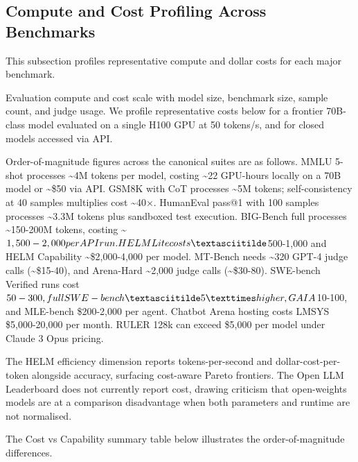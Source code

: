\documentclass{article}
\begin{document}
\subsection{Compute and Cost Profiling Across Benchmarks}\label{compute-and-cost-profiling-across-benchmarks}

This subsection profiles representative compute and dollar costs for each major benchmark.

Evaluation compute and cost scale with model size, benchmark size, sample count, and judge usage. We profile representative costs below for a frontier 70B-class model evaluated on a single H100 GPU at 50 tokens/s, and for closed models accessed via API.

Order-of-magnitude figures across the canonical suites are as follows. MMLU 5-shot processes \textasciitilde4M tokens per model, costing \textasciitilde22 GPU-hours locally on a 70B model or \textasciitilde\$50 via API. GSM8K with CoT processes \textasciitilde5M tokens; self-consistency at 40 samples multiplies cost \textasciitilde40×. HumanEval pass@1 with 100 samples processes \textasciitilde3.3M tokens plus sandboxed test execution. BIG-Bench full processes \textasciitilde150-200M tokens, costing \textasciitilde$1,500-2,000 per API run. HELM Lite costs \textasciitilde$500-1,000 and HELM Capability \textasciitilde\$2,000-4,000 per model. MT-Bench needs \textasciitilde320 GPT-4 judge calls (\textasciitilde\$15-40), and Arena-Hard \textasciitilde2,000 judge calls (\textasciitilde\$30-80). SWE-bench Verified runs cost $50-300, full SWE-bench \textasciitilde5× higher, GAIA $10-100, and MLE-bench \$200-2,000 per agent. Chatbot Arena hosting costs LMSYS \$5,000-20,000 per month. RULER 128k can exceed \$5,000 per model under Claude 3 Opus pricing.

The HELM efficiency dimension reports tokens-per-second and dollar-cost-per-token alongside accuracy, surfacing cost-aware Pareto frontiers. The Open LLM Leaderboard does not currently report cost, drawing criticism that open-weights models are at a comparison disadvantage when both parameters and runtime are not normalised.

The Cost vs Capability summary table below illustrates the order-of-magnitude differences.
\end{document}
